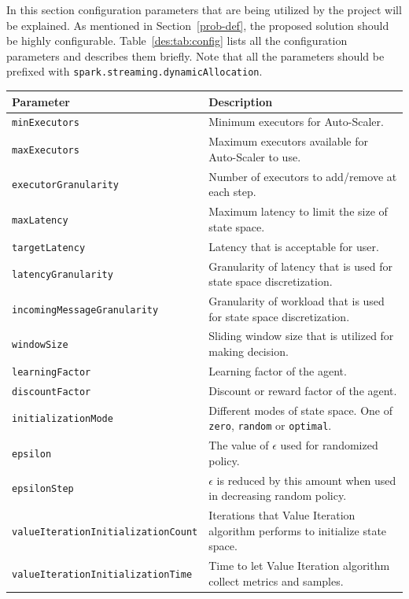 In this section configuration parameters that are being utilized by the project will be explained. As mentioned in Section~\ref{prob-def}, the proposed solution should be highly configurable. Table~\ref{des:tab:config} lists all the configuration parameters and describes them briefly. Note that all the parameters should be prefixed with \lstinline|spark.streaming.dynamicAllocation|.
\begin{table}[h]
    \begin{tabularx}{\textwidth}{lX}
        \toprule
        \textbf{Parameter} & \textbf{Description}\\
        \midrule
        \lstinline|minExecutors| & Minimum executors for Auto-Scaler.\\
        \lstinline|maxExecutors| & Maximum executors available for Auto-Scaler to use. \\
        \lstinline|executorGranularity| & Number of executors to add/remove at each step. \\
        \lstinline|maxLatency| & Maximum latency to limit the size of state space. \\
        \lstinline|targetLatency| & Latency that is acceptable for user. \\
        \lstinline|latencyGranularity| & Granularity of latency that is used for state space discretization. \\
        \lstinline|incomingMessageGranularity| & Granularity of workload that is used for state space discretization. \\
        \lstinline|windowSize| & Sliding window size that is utilized for making decision. \\
        \lstinline|learningFactor| & Learning factor of the agent. \\
        \lstinline|discountFactor| & Discount or reward factor of the agent. \\
        \lstinline|initializationMode| & Different modes of state space. One of \lstinline|zero|, \lstinline|random| or \lstinline|optimal|. \\
        \lstinline|epsilon| & The value of $\epsilon$ used for randomized policy. \\
        \lstinline|epsilonStep| & $\epsilon$ is reduced by this amount when used in decreasing random policy. \\
        \lstinline|valueIterationInitializationCount| & Iterations that Value Iteration algorithm performs to initialize state space.\\
        \lstinline|valueIterationInitializationTime| & Time to let Value Iteration algorithm collect metrics and samples. \\

\end{tabularx}
\end{table}
